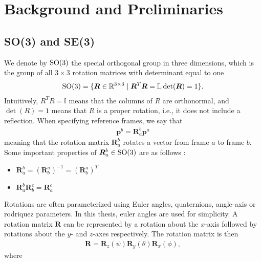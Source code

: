 \chapter{Background and Preliminaries}

\section{SO(3) and SE(3)}

We denote by $\operatorname{SO}(3)$ the special orthogonal group in three dimensions, which is
the group of all $3 \times 3$ rotation matrices with determinant equal to one
\begin{align}
    \operatorname{SO}(3) = \{ \bm{R} \in \mathbb{R}^{3 \times 3} \mid \bm{R}^T \bm{R} = \mathbb{I}, \det(\bm{R}) = 1 \}.
\end{align}
Intuitively, $R^T R = \mathbb{I}$ means that the columns of $R$ are orthonormal,
and $\det(R) = 1$ means that $R$ is a proper rotation, i.e., it does not include
a reflection. When specifying reference frames, we say that
\begin{align}
    \bm{p}^b = \bm{R}_{a}^b \bm{p}^a
\end{align}
meaning that the rotation matrix $\bm{R}_{a}^b$ rotates a vector from frame $a$
to frame $b$. Some important properties of $\bm{R}_a^b \in \operatorname{SO}(3)$ are as follows \cite{modsim}:
\begin{itemize}
\item $\bm{R}_a^b = (\bm{R}_b^a)^{-1} = (\bm{R}_b^a)^T$
\item $\bm{R}_a^b \bm{R}_b^c = \bm{R}_a^c$
\end{itemize}
Rotations are often parameterized using Euler angles, quaternions, angle-axis or
rodriquez parameters. In this thesis, euler angles are used for simplicity. A
rotation matrix $\bm{R}$ can be represented by a rotation about the $x$-axis followed
by rotations about the $y$- and $z$-axes respectively. The rotation matrix is then \cite{modsim}
\begin{align}
    \bm{R} = \bm{R}_z(\psi) \bm{R}_y(\theta) \bm{R}_x(\phi),
\end{align}
where
